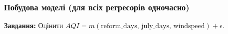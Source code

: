 ﻿\documentclass{beamer}
\begin{document}
\begin{frame}
  \frametitle{Побудова моделі (для всіх регресорів одночасно)}
  \textbf{Завдання:} Оцінити $AQI = m(\text{reform\_days, july\_days, windspeed}) + \epsilon$.

%
%
\end{frame}
\end{document}
